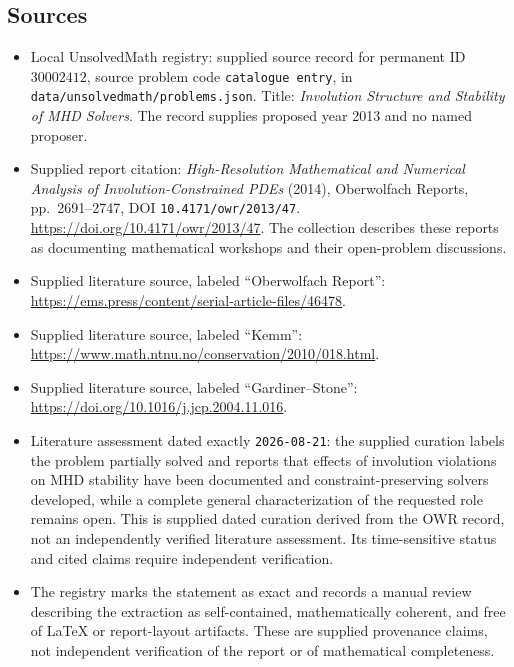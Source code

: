 \documentclass[11pt]{article}
\begin{document}
\subsection{Sources}
\begin{itemize}
\item Local UnsolvedMath registry: supplied source record for permanent ID \(30002412\), source problem code \texttt{catalogue entry}, in \texttt{data/unsolvedmath/problems.json}. Title: \emph{Involution Structure and Stability of MHD Solvers}. The record supplies proposed year 2013 and no named proposer.
\item Supplied report citation: \emph{High-Resolution Mathematical and Numerical Analysis of Involution-Constrained PDEs} (2014), Oberwolfach Reports, pp.\ 2691--2747, DOI \texttt{10.4171/owr/2013/47}. \url{https://doi.org/10.4171/owr/2013/47}. The collection describes these reports as documenting mathematical workshops and their open-problem discussions.
\item Supplied literature source, labeled ``Oberwolfach Report'': \url{https://ems.press/content/serial-article-files/46478}.
\item Supplied literature source, labeled ``Kemm'': \url{https://www.math.ntnu.no/conservation/2010/018.html}.
\item Supplied literature source, labeled ``Gardiner--Stone'': \url{https://doi.org/10.1016/j.jcp.2004.11.016}.
\item Literature assessment dated exactly \texttt{2026-08-21}: the supplied curation labels the problem partially solved and reports that effects of involution violations on MHD stability have been documented and constraint-preserving solvers developed, while a complete general characterization of the requested role remains open. This is supplied dated curation derived from the OWR record, not an independently verified literature assessment. Its time-sensitive status and cited claims require independent verification.
\item The registry marks the statement as exact and records a manual review describing the extraction as self-contained, mathematically coherent, and free of LaTeX or report-layout artifacts. These are supplied provenance claims, not independent verification of the report or of mathematical completeness.
\end{itemize}
\end{document}
